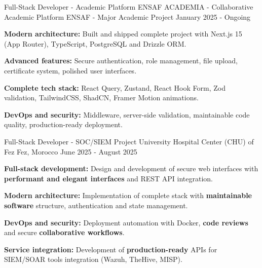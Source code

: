 
\begin{cventries}

    \cventry
    {Full-Stack Developer - Academic Platform} %
    {ENSAF ACADEMIA - Collaborative Academic Platform} %
    {ENSAF - Major Academic Project} %
    {January 2025 - Ongoing} %
    {
        \begin{cvitems}
            \item {
                        \textbf{Modern architecture:} Built and shipped complete project with Next.js 15 (App Router), TypeScript, PostgreSQL and Drizzle ORM.}
            \item {
                        \textbf{Advanced features:} Secure authentication, role management, file upload, certificate system, polished user interfaces.}
            \item {
                        \textbf{Complete tech stack:} React Query, Zustand, React Hook Form, Zod validation, TailwindCSS, ShadCN, Framer Motion animations.}
            \item {
                        \textbf{DevOps and security:} Middleware, server-side validation, maintainable code quality, production-ready deployment.}
        \end{cvitems}
    }

    \cventry
    {Full-Stack Developer - SOC/SIEM Project} %
    {University Hospital Center (CHU) of Fez} %
    {Fez, Morocco} %
    {June 2025 - August 2025} %
    {
        \begin{cvitems}
            \item {
                        \textbf{Full-stack development:} Design and development of secure web interfaces with \textbf{performant and elegant interfaces} and REST API integration.}
            \item {
                        \textbf{Modern architecture:} Implementation of complete stack with \textbf{maintainable software} structure, authentication and state management.}
            \item {
                        \textbf{DevOps and security:} Deployment automation with Docker, \textbf{code reviews} and secure \textbf{collaborative workflows}.}
            \item {
                        \textbf{Service integration:} Development of \textbf{production-ready} APIs for SIEM/SOAR tools integration (Wazuh, TheHive, MISP).}
        \end{cvitems}
    }


\end{cventries}
